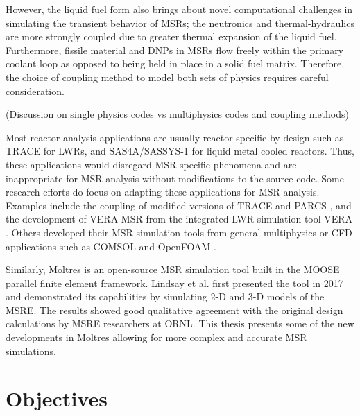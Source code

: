 However, the liquid fuel form also brings about novel computational
challenges in simulating the transient behavior of \glspl{MSR}; the
neutronics and thermal-hydraulics are more strongly coupled due
to greater thermal expansion of the liquid fuel. Furthermore, fissile material
and \glspl{DNP} in \glspl{MSR} flow freely within the primary coolant
loop as opposed to being held in place in a solid fuel matrix. Therefore,
the choice of coupling method to model both sets of physics requires careful
consideration.

(Discussion on single physics codes vs multiphysics codes and coupling methods)

Most reactor analysis applications are usually reactor-specific by
design such as TRACE \cite{nrc_trace_nodate} for \glspl{LWR}, and
SAS4A/SASSYS-1 \cite{fanning_sas4a/sassys-1_2017} for
liquid metal cooled reactors. Thus, these applications would disregard
\gls{MSR}-specific phenomena and are inappropriate for \gls{MSR}
analysis without modifications to the source code. Some research efforts
do focus on adapting these applications for \gls{MSR} analysis. Examples
include the coupling of modified versions of TRACE and PARCS
\cite{pettersen_coupled_2016}, and the development of VERA-MSR from the
integrated \gls{LWR} simulation tool VERA \cite{graham_development_2019}.
Others developed their \gls{MSR} simulation tools from general
multiphysics or \gls{CFD} applications such as COMSOL
\cite{fiorina_modelling_2014} and OpenFOAM \cite{aufiero_development_2014}.

Similarly, Moltres \cite{lindsay_introduction_2018} is an open-source MSR
simulation tool built in the \gls{MOOSE} \cite{gaston_physics-based_2015}
parallel finite element framework. Lindsay et al.
\cite{lindsay_introduction_2018} first presented the tool in 2017 and
demonstrated its capabilities by simulating 2-D and 3-D models of the
\gls{MSRE}. The results showed good qualitative
agreement with the original design calculations by \gls{MSRE} researchers at
\gls{ORNL}. This thesis presents some of the new developments in Moltres
allowing for more complex and accurate \gls{MSR} simulations.

\section{Objectives}

